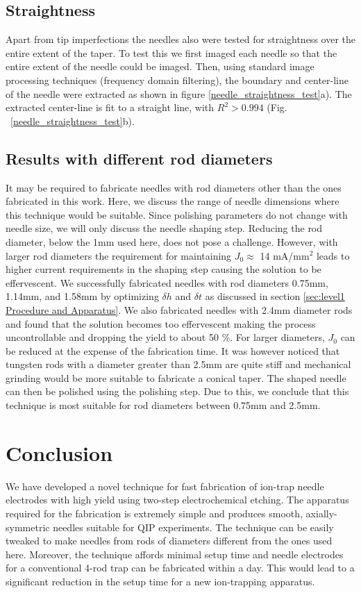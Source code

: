 \documentclass[%
 aip,
 amsmath,amssymb,
 reprint,%
]{revtex4-1}
\begin{document}
\subsection{Straightness}
Apart from tip imperfections the needles also were tested for straightness over the entire extent of the taper.
To test this we first imaged each needle so that the entire extent of the needle could be imaged. 
Then, using standard image processing techniques\cite{CompVision} (frequency domain filtering), the boundary and center-line of the needle were extracted as shown in figure \ref{needle_straightness_test}a). 
The extracted center-line is fit to a straight line, with $R^2>0.994$ (Fig. ~\ref{needle_straightness_test}b).

\subsection{ Results with different rod diameters }
It may be required to fabricate needles with rod diameters other than the ones fabricated in this work.
Here, we discuss the range of needle dimensions where this technique would be suitable.
Since polishing parameters do not change with needle size, we will only discuss the needle shaping step.
Reducing the rod diameter, below the 1mm used here, does not pose a challenge.
However, with larger rod diameters the requirement for maintaining  $J_0 \approx$ 14 mA/mm$^2$ leads to higher current requirements in the shaping step causing the solution to be effervescent.
We successfully fabricated needles with rod diameters 0.75mm, 1.14mm, and 1.58mm by optimizing $\delta h$ and $\delta t$ as discussed in section \ref{sec:level1 Procedure and Apparatus}.
We also fabricated needles with 2.4mm diameter rods and found that the solution becomes too effervescent making the process uncontrollable and dropping the yield to about 50 \%.
For larger diameters, $J_0$ can be reduced at the expense of the fabrication time.
It was however noticed that tungsten rods with a diameter greater than 2.5mm are quite stiff and mechanical grinding would be more suitable to fabricate a conical taper.
The shaped needle can then be polished using the polishing step.
Due to this, we conclude that this technique is most suitable for rod diameters between 0.75mm and 2.5mm.


\section{Conclusion}
We have developed a novel technique for fast fabrication of ion-trap needle electrodes with high yield using two-step electrochemical etching. 
The apparatus required for the fabrication is extremely simple and produces smooth, axially-symmetric needles suitable for QIP experiments. 
The technique can be easily tweaked to make needles from rods of diameters different from the ones used here. 
Moreover, the technique affords minimal setup time and needle electrodes for a conventional 4-rod trap can be fabricated within a day. 
This would lead to a significant reduction in the setup time for a new ion-trapping apparatus.
\end{document}
